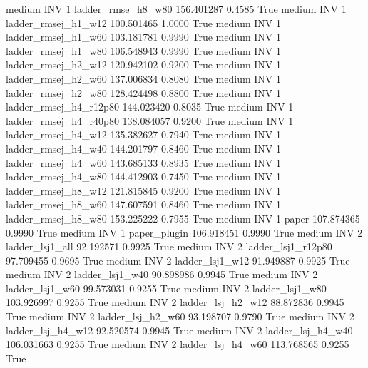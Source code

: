     medium      INV                 1     ladder_rmse_h8_w80 156.401287      0.4585    True
    medium      INV                 1    ladder_rmsej_h1_w12 100.501465      1.0000    True
    medium      INV                 1    ladder_rmsej_h1_w60 103.181781      0.9990    True
    medium      INV                 1    ladder_rmsej_h1_w80 106.548943      0.9990    True
    medium      INV                 1    ladder_rmsej_h2_w12 120.942102      0.9200    True
    medium      INV                 1    ladder_rmsej_h2_w60 137.006834      0.8080    True
    medium      INV                 1    ladder_rmsej_h2_w80 128.424498      0.8800    True
    medium      INV                 1 ladder_rmsej_h4_r12p80 144.023420      0.8035    True
    medium      INV                 1 ladder_rmsej_h4_r40p80 138.084057      0.9200    True
    medium      INV                 1    ladder_rmsej_h4_w12 135.382627      0.7940    True
    medium      INV                 1    ladder_rmsej_h4_w40 144.201797      0.8460    True
    medium      INV                 1    ladder_rmsej_h4_w60 143.685133      0.8935    True
    medium      INV                 1    ladder_rmsej_h4_w80 144.412903      0.7450    True
    medium      INV                 1    ladder_rmsej_h8_w12 121.815845      0.9200    True
    medium      INV                 1    ladder_rmsej_h8_w60 147.607591      0.8460    True
    medium      INV                 1    ladder_rmsej_h8_w80 153.225222      0.7955    True
    medium      INV                 1                  paper 107.874365      0.9990    True
    medium      INV                 1           paper_plugin 106.918451      0.9990    True
    medium      INV                 2        ladder_lsj1_all  92.192571      0.9925    True
    medium      INV                 2     ladder_lsj1_r12p80  97.709455      0.9695    True
    medium      INV                 2        ladder_lsj1_w12  91.949887      0.9925    True
    medium      INV                 2        ladder_lsj1_w40  90.898986      0.9945    True
    medium      INV                 2        ladder_lsj1_w60  99.573031      0.9255    True
    medium      INV                 2        ladder_lsj1_w80 103.926997      0.9255    True
    medium      INV                 2      ladder_lsj_h2_w12  88.872836      0.9945    True
    medium      INV                 2      ladder_lsj_h2_w60  93.198707      0.9790    True
    medium      INV                 2      ladder_lsj_h4_w12  92.520574      0.9945    True
    medium      INV                 2      ladder_lsj_h4_w40 106.031663      0.9255    True
    medium      INV                 2      ladder_lsj_h4_w60 113.768565      0.9255    True
